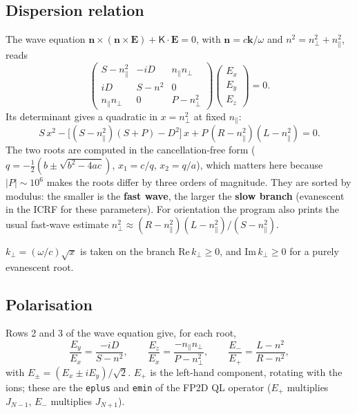 \documentclass[11pt,a4paper]{article}
\newcommand{\npar}{n_\parallel}
\newcommand{\nperp}{n_\perp}
\newcommand{\code}[1]{\texttt{#1}}
\begin{document}
\subsection{Dispersion relation}

The wave equation $\mathbf{n}\times(\mathbf{n}\times\mathbf{E})+\mathsf{K}\cdot\mathbf{E}=0$,
with $\mathbf{n}=c\mathbf{k}/\omega$ and $n^2=\nperp^2+\npar^2$, reads
\begin{equation}
\begin{pmatrix}
S-\npar^2 & -iD & \npar\nperp\\
iD & S-n^2 & 0\\
\npar\nperp & 0 & P-\nperp^2
\end{pmatrix}
\begin{pmatrix}E_x\\E_y\\E_z\end{pmatrix}=0 .
\end{equation}
Its determinant gives a quadratic in $x=\nperp^2$ at fixed $\npar$:
\begin{equation}
S\,x^2-\bigl[(S-\npar^2)(S+P)-D^2\bigr]\,x+P\,(R-\npar^2)(L-\npar^2)=0 .
\end{equation}
The two roots are computed in the cancellation-free form
($q=-\tfrac12(b\pm\sqrt{b^2-4ac})$, $x_1=c/q$, $x_2=q/a$), which matters here
because $|P|\sim10^6$ makes the roots differ by three orders of magnitude.
They are sorted by modulus: the smaller is the \textbf{fast wave}, the larger
the \textbf{slow branch} (evanescent in the ICRF for these parameters).
For orientation the program also prints the usual fast-wave estimate
$\nperp^2\approx(R-\npar^2)(L-\npar^2)/(S-\npar^2)$.

$k_\perp=(\omega/c)\sqrt{x}$ is taken on the branch $\mathrm{Re}\,k_\perp\ge0$,
and $\mathrm{Im}\,k_\perp\ge0$ for a purely evanescent root.

\subsection{Polarisation}

Rows 2 and 3 of the wave equation give, for each root,
\begin{equation}
\frac{E_y}{E_x}=\frac{-iD}{S-n^2},\qquad
\frac{E_z}{E_x}=\frac{-\npar\nperp}{P-\nperp^2},\qquad
\frac{E_-}{E_+}=\frac{L-n^2}{R-n^2},
\end{equation}
with $E_\pm=(E_x\pm iE_y)/\sqrt2$. $E_+$ is the left-hand component, rotating
with the ions; these are the \code{eplus} and \code{emin} of the FP2D QL
operator ($E_+$ multiplies $J_{N-1}$, $E_-$ multiplies $J_{N+1}$).
\end{document}
